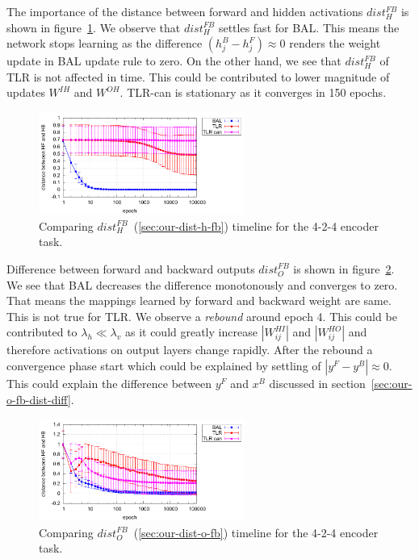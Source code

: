 The importance of the distance between forward and hidden activations $dist_{H}^{FB}$ is shown in figure~\ref{fig:results-candidates-h-fb-d}. We observe that $dist_{H}^{FB}$ settles fast for BAL. This means the network stops learning as the difference $(h^B_j - h^F_j) \approx 0$ renders the weight update in BAL update rule to zero. On the other hand, we see that $dist_{H}^{FB}$ of TLR is not affected in time. This could be contributed to lower magnitude of updates $W^{IH}$ and $W^{OH}$. TLR-can is stationary as it converges in 150 epochs. 

\begin{figure}[H]
  \centering
  \includegraphics[width=0.6\textwidth]{img/feature-cmp-h-fb-d.pdf}  
   \caption{Comparing $dist_{H}^{FB}$~(\ref{sec:our-dist-h-fb}) timeline for the {4-2-4 encoder} task.}
  \label{fig:results-candidates-h-fb-d}
\end{figure}

Difference between forward and backward outputs $dist_{O}^{FB}$ is shown in figure~\ref{fig:results-candidates-o-fb-d}. We see that BAL decreases the difference monotonously and converges to zero. That means the mappings learned by forward and backward weight are same. This is not true for TLR. We observe a \emph{rebound} around epoch 4. This could be contributed to $\lambda_h \ll \lambda_v$ as it could greatly increase $|W^{HI}_{ij}|$ and $|W^{HO}_{ij}|$ and therefore activations on output layers change rapidly. After the rebound a convergence phase start which could be explained by settling of $|y^{F} - y^{B}| \approx 0$. This could explain the difference between $y^{F}$ and $x^B$ discussed in section~\ref{sec:our-o-fb-dist-diff}. 

\begin{figure}[H]
  \centering
  \includegraphics[width=0.6\textwidth]{img/feature-cmp-o-fb-d.pdf}  
   \caption{Comparing $dist_{O}^{FB}$~(\ref{sec:our-dist-o-fb}) timeline for the {4-2-4 encoder} task.}
  \label{fig:results-candidates-o-fb-d}
\end{figure}

